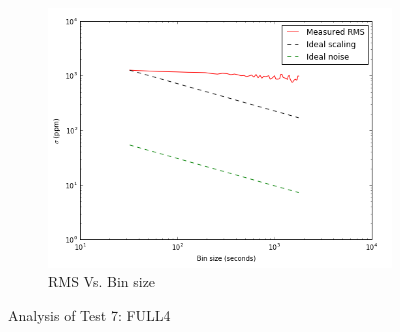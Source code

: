 \documentclass[conference]{IEEEtran}
\begin{document}
\begin{figure}[H]
    \begin{subfigure}{3}
        \includegraphics[scale=0.6]{rms_test7}
        \caption{RMS Vs. Bin size}
    \end{subfigure}
    \caption{Analysis of Test 7: FULL4}
\end{figure}
\end{document}
